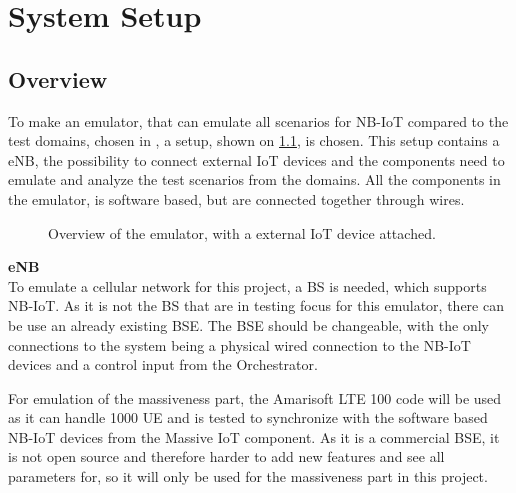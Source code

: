 \chapter{System Setup}

\section{Overview}

To make an emulator, that can emulate all scenarios for NB-IoT compared to the test domains, chosen in , a setup, shown on \ref{fig:Systemover}, is chosen. This setup contains a \gls{eNB}, the possibility to connect external IoT devices and the components need to emulate and analyze the test scenarios from the domains. All the components in the emulator, is software based, but are connected together through wires.

\begin{figure}[H]
\centering
\resizebox{0.5\textwidth}{!}{
}
\caption{Overview of the emulator, with a external IoT device attached.}
\label{fig:Systemover}
\end{figure}





\textbf{eNB}\\

To emulate a cellular network for this project, a \gls{BS} is needed, which supports \gls{NB-IoT}. As it is not the BS that are in testing focus for this emulator, there can be use an already existing \gls{BSE}. The BSE should be changeable, with the only connections to the system being a physical wired connection to the NB-IoT devices and a control input from the Orchestrator.

For emulation of the massiveness part, the Amarisoft LTE 100 code will be used as it can handle 1000 \gls{UE}  and is tested to synchronize with the software based NB-IoT devices from the Massive IoT component. As it is a commercial BSE, it is not open source and therefore harder to add new features and see all parameters for, so it will only be used for the massiveness part in this project.

